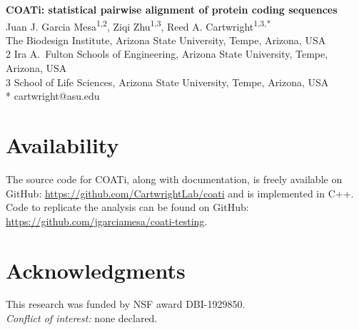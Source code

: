



\begin{flushleft}
{\Large\textbf{COATi: statistical pairwise alignment of protein coding sequences}}
\newline
\\
Juan J. Garcia Mesa\textsuperscript{1,2},
Ziqi Zhu\textsuperscript{1,3},
Reed A. Cartwright\textsuperscript{1,3,*}
\\
 The Biodesign Institute, Arizona State University, Tempe, Arizona, USA
\\
2 Ira A.\ Fulton Schools of Engineering, Arizona State University, Tempe, Arizona, USA
\\
3 School of Life Sciences, Arizona State University, Tempe, Arizona, USA
\\
\bigskip
* cartwright@asu.edu

\end{flushleft}



\linenumbers







\section*{Availability}
The source code for COATi, along with documentation, is
freely available on GitHub: \url{https://github.com/CartwrightLab/coati} and is
implemented in C++.
Code to replicate the analysis can be found on GitHub: \url{https://github.com/jgarciamesa/coati-testing}.


\section*{Acknowledgments}

This research was funded by NSF award DBI-1929850.\\

\noindent \textit{Conflict of interest:} none declared.

%
\setlength{\bibhang}{0pt}


\nolinenumbers


